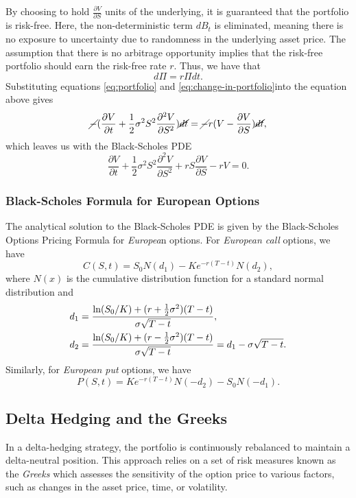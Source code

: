 By choosing to hold $\frac{\partial V}{\partial S}$ units of the underlying, it is guaranteed that the portfolio is risk-free. Here, the non-deterministic term $dB_t$ is eliminated, meaning there is no
exposure to uncertainty due to randomness in the underlying asset price. The assumption that there is no arbitrage opportunity implies that the risk-free portfolio should earn the risk-free rate $r$. Thus, we have that
\begin{equation}
    d\Pi = r \Pi dt.
\end{equation}
Substituting equations \eqref{eq:portfolio} and \eqref{eq:change-in-portfolio}into the equation above gives
\begin{equation}
    \cancel{-}(\frac{\partial V}{\partial t} + \frac{1}{2} \sigma^2 S^2 \frac{\partial^2 V}{\partial S^2}) \cancel{dt} = \cancel{-}r (V - \frac{\partial V}{\partial S}) \cancel{dt},
\end{equation}
which leaves us with the Black-Scholes PDE
\begin{equation}
    \frac{\partial V}{\partial t} + \frac{1}{2} \sigma^2 S^2 \frac{\partial^2 V}{\partial S^2} + rS \frac{\partial V}{\partial S} - rV = 0. \label{eq:black-scholes-pde}
\end{equation}

\subsubsection{Black-Scholes Formula for European Options} 
The analytical solution to the Black-Scholes PDE is given by the Black-Scholes Options Pricing Formula for \textit{Europea}n options. For \textit{European call} options, we have
\begin{equation}
    C(S,t) = S_0 N(d_1) - K e^{-r(T-t)} N(d_2),
\end{equation}
where $N(x)$ is the cumulative distribution function for a standard normal distribution and
\begin{align}
    d_1 {}={}& \frac{\ln (S_0 / K) + (r + \frac{1}{2}\sigma^2)(T-t)}{\sigma \sqrt{T-t}}, \notag \\
    d_2 {}={}& \frac{\ln (S_0 / K) + (r - \frac{1}{2}\sigma^2)(T-t)}{\sigma \sqrt{T-t}} = d_1 - \sigma \sqrt{T-t}. \notag
\end{align}
Similarly, for \textit{European put} options, we have
\begin{equation}
   P(S,t) = Ke^{-r(T-t)}N(-d_2) - S_0 N(-d_1).
\end{equation}


\subsection{Delta Hedging and the Greeks}
In a delta-hedging strategy, the portfolio is continuously rebalanced to maintain a delta-neutral position. This approach relies on a set of risk measures known as 
the \textit{Greeks} which assesses the sensitivity of the option price to various factors, such as changes in the asset price, time, or volatility. 

